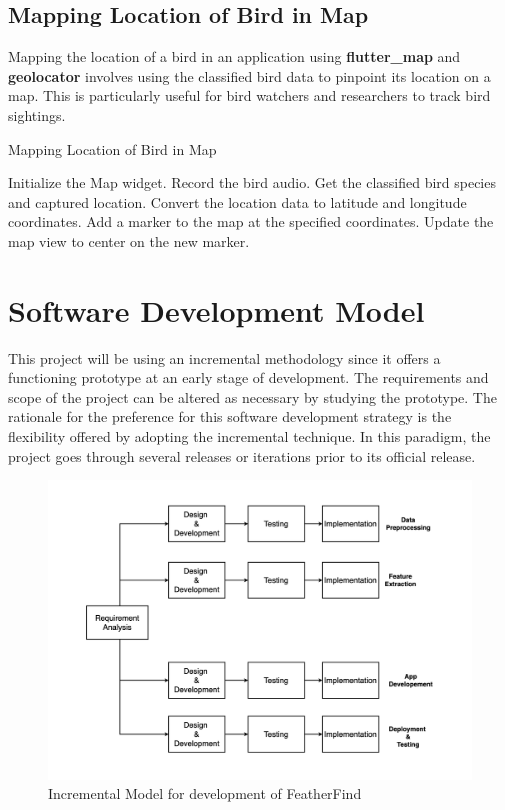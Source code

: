 \subsection{Mapping Location of Bird in Map}

Mapping the location of a bird in an application using \textbf{flutter\_map} and
\textbf{geolocator} involves using the classified bird data to pinpoint its
location on a map. This is particularly useful for bird watchers and
researchers to track bird sightings.

\begin{algorithm}
    \caption{Mapping Location of Bird in Map}
    \begin{algorithmic}[1]
        \STATE Initialize the Map widget.
        \STATE Record the bird audio.
        \STATE Get the classified bird species and captured location.
        \STATE Convert the location data to latitude and longitude coordinates.
        \STATE Add a marker to the map at the specified coordinates.
        \STATE Update the map view to center on the new marker.
    \end{algorithmic}
\end{algorithm}
\newpage


\newpage
\section{Software Development Model}
This project will be using an incremental methodology since it offers a
functioning prototype at an early stage of development. The requirements and
scope of the project can be altered as necessary by studying the prototype. The
rationale for the preference for this software development strategy is the
flexibility offered by adopting the incremental technique. In this paradigm,
the project goes through several releases or iterations prior to its official
release.
\begin{figure}[h!]
    \includegraphics[scale=0.25]{images/SDLC.png}
    \caption{Incremental Model for development of
        FeatherFind}%
\end{figure}

